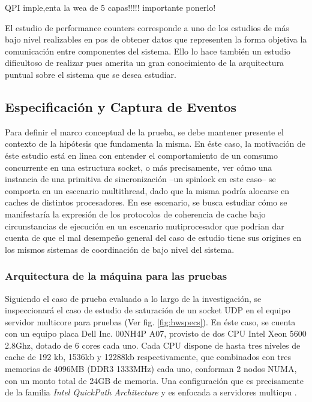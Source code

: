 QPI imple,enta la wea de 5 capas!!!!! importante ponerlo!

El estudio de performance counters corresponde a uno de los estudios de más bajo nivel realizables en pos de obtener datos que representen la forma objetiva la comunicación entre componentes del sistema. Ello lo hace también un estudio dificultoso de realizar pues amerita un gran conocimiento de la arquitectura puntual sobre el sistema que se desea estudiar.

\subsection{Especificación y Captura de Eventos}
Para definir el marco conceptual de la prueba, se debe mantener presente el contexto de la hipótesis que fundamenta la misma. En éste caso, la motivación de éste estudio está en linea con entender el comportamiento de un comsumo concurrente en una estructura socket, o más precisamente, ver cómo una instancia de una primitiva de sincronización --un spinlock en este caso-- se comporta en un escenario multithread, dado que la misma podría alocarse en caches de distintos procesadores. En ese escenario, se busca estudiar cómo se manifestaría la expresión de los protocolos de coherencia de cache bajo circunstancias de ejecución en un escenario mutiprocesador que podrian dar cuenta de que el mal desempeño general del caso de estudio tiene sus origines en los mismos sistemas de coordinación de bajo nivel del sistema.

\subsubsection{Arquitectura de la máquina para las pruebas}
Siguiendo el caso de prueba evaluado a lo largo de la investigación, se inspeccionará el caso de estudio de saturación de un socket UDP en el equipo servidor multicore para pruebas (Ver fig. \ref{fig:hwspecs}). En éste caso, se cuenta con un equipo placa Dell Inc. 00NH4P A07, provisto de dos CPU Intel Xeon 5600 2.8Ghz, dotado de 6 cores cada uno. Cada CPU dispone de hasta tres niveles de cache de 192 kb, 1536kb y 12288kb respectivamente, que combinados con tres memorias de 4096MB (DDR3 1333MHz) cada uno, conforman 2 nodos NUMA, con un monto total de 24GB de memoria. Una configuración que es precisamente de la familia \emph{Intel QuickPath Architecture} y es enfocada a servidores multicpu \cite{report:intelxeon5600, manual:intelxeon5600}.

